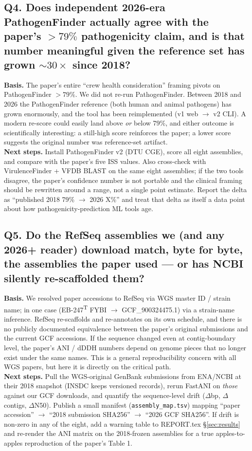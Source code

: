 \subsection*{Q4. Does independent 2026-era PathogenFinder actually agree with the paper's
$>79\%$ pathogenicity claim, and is that number meaningful given the reference set has
grown ${\sim}30\times$ since 2018?}
\textbf{Basis.} The paper's entire ``crew health consideration'' framing pivots on
PathogenFinder $>79\%$. We did not re-run PathogenFinder. Between 2018 and 2026 the
PathogenFinder reference (both human and animal pathogens) has grown enormously, and the
tool has been reimplemented (v1 web $\to$ v2 CLI). A modern re-score could easily land
above \emph{or} below 79\%, and either outcome is scientifically interesting: a still-high
score reinforces the paper; a lower score suggests the original number was reference-set
artifact. \\
\textbf{Next steps.} Install PathogenFinder v2 (DTU CGE), score all eight assemblies, and
compare with the paper's five ISS values. Also cross-check with VirulenceFinder + VFDB
BLAST on the same eight assemblies; if the two tools disagree, the paper's confidence
number is not portable and the clinical framing should be rewritten around a range, not a
single point estimate. Report the delta as ``published 2018 79\% $\to$ 2026 X\%'' and treat
that delta as itself a data point about how pathogenicity-prediction ML tools age.

\subsection*{Q5. Do the RefSeq assemblies we (and any 2026+ reader) download match, byte
for byte, the assemblies the paper used --- or has NCBI silently re-scaffolded them?}
\textbf{Basis.} We resolved paper accessions to RefSeq via WGS master ID / strain name;
in one case (EB-247\textsuperscript{T} FYBI $\to$ GCF\_900324475.1) via a strain-name
inference. RefSeq re-scaffolds and re-annotates on its own schedule, and there is no
publicly documented equivalence between the paper's original submissions and the current
GCF accessions. If the sequence changed even at contig-boundary level, the paper's ANI /
dDDH numbers depend on genome pieces that no longer exist under the same names. This is a
general reproducibility concern with all WGS papers, but here it is directly on the
critical path. \\
\textbf{Next steps.} Pull the WGS-original GenBank submissions from ENA/NCBI at their 2018
snapshot (INSDC keeps versioned records), rerun FastANI on \emph{those} against our GCF
downloads, and quantify the sequence-level drift ($\Delta$bp, $\Delta$contigs, $\Delta$N50).
Publish a small manifest (\texttt{assembly\_map.tsv}) mapping ``paper accession'' $\to$
``2018 submission SHA256'' $\to$ ``2026 GCF SHA256''. If drift is non-zero in any of the
eight, add a warning table to REPORT.tex \S\ref{sec:results} and re-render the ANI matrix
on the 2018-frozen assemblies for a true apples-to-apples reproduction of the paper's Table 1.
